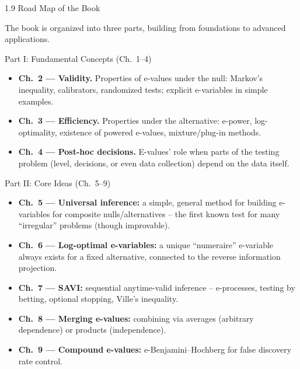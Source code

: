 \documentclass[aspectratio=169,10pt]{beamer}
\begin{document}
\begin{frame}[allowframebreaks]{1.9 Road Map of the Book}

The book is organized into three parts, building from foundations to
advanced applications.

\begin{block}{Part I: Fundamental Concepts (Ch.\ 1--4)}
\begin{itemize}
  \item \textbf{Ch.\ 2 --- Validity.} Properties of e-values under the
    null: Markov's inequality, calibrators, randomized tests; explicit
    e-variables in simple examples.
  \item \textbf{Ch.\ 3 --- Efficiency.} Properties under the alternative:
    e-power, log-optimality, existence of powered e-values, mixture/plug-in
    methods.
  \item \textbf{Ch.\ 4 --- Post-hoc decisions.} E-values' role when parts
    of the testing problem (level, decisions, or even data collection)
    depend on the data itself.
\end{itemize}
\end{block}

\framebreak

\begin{block}{Part II: Core Ideas (Ch.\ 5--9)}
\begin{itemize}
  \item \textbf{Ch.\ 5 --- Universal inference:} a simple, general method
    for building e-variables for composite nulls/alternatives -- the first
    known test for many ``irregular'' problems (though improvable).
  \item \textbf{Ch.\ 6 --- Log-optimal e-variables:} a unique
    ``numeraire'' e-variable always exists for a fixed alternative,
    connected to the reverse information projection.
  \item \textbf{Ch.\ 7 --- SAVI:} sequential anytime-valid inference --
    e-processes, testing by betting, optional stopping, Ville's inequality.
  \item \textbf{Ch.\ 8 --- Merging e-values:} combining via averages
    (arbitrary dependence) or products (independence).
  \item \textbf{Ch.\ 9 --- Compound e-values:} e-Benjamini--Hochberg for
    false discovery rate control.
\end{itemize}
\end{block}

\framebreak


\end{frame}
\end{document}
